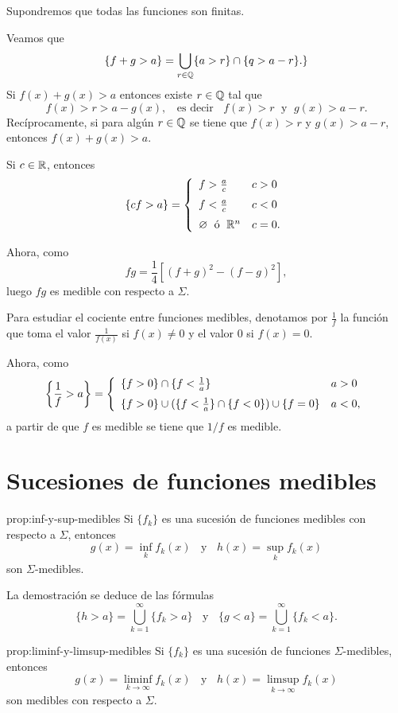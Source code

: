 \begin{demo}
Supondremos que todas las funciones son finitas.

Veamos que 
\[
\{
f+g>a\}=\bigcup\limits_{r \in \mathbb{Q}} \{ a>r\} \cap \{q>a-r\}.
\}
\]
Si $f(x)+g(x)>a$ entonces existe $r \in \mathbb{Q}$ tal que 
\[
f(x)>r>a-g(x),\;\;\mbox{ es decir }\;\; 
f(x)>r\;\mbox{ y }\; g(x)>a-r.
\]
Rec\'iprocamente, si para alg\'un $r\in \mathbb{Q}$ se tiene que $f(x)>r$ y $g(x)>a-r$, entonces $f(x)+g(x)>a$.

Si $c\in \mathbb{R}$, entonces
\[
\{cf>a\}=
\left\{
\begin{array}{ll}
f>\frac{a}{c}&c>0
\medskip
\\
f<\frac{a}{c}&c<0
\medskip
\\
\emptyset\;\mbox{ \'o }\;\rr^n &c=0.
\end{array}
\right.
\]

Ahora, como 
\[
fg=\frac{1}{4}\left[(f+g)^2-(f-g)^2\right],
\]
luego $fg$ es medible con respecto a $\Sigma$. 

Para estudiar el cociente entre funciones medibles, denotamos por $\frac{1}{f}$
la funci\'on que toma el valor $\frac{1}{f(x)}$ si $f(x)\neq 0$ y el valor $0$ si $f(x)=0$.

Ahora, como 
\[
\left\{\frac{1}{f}>a\right\}
=
\left \{
\begin{array}{ll}
 \{f>0\} \cap \{f<\frac{1}{a}\}    &  a>0 
 \medskip
 \\
 \{ f>0\} \cup  (\{f<\frac{1}{a}\} \cap \{f<0\}) \cup \{f=0\}
     & a<0, 
\end{array}
\right.
\]
a partir de que $f$ es medible se tiene que  $1/f$ es medible. 
\end{demo}

\section{Sucesiones de funciones medibles}

\begin{proposicion}{prop:inf-y-sup-medibles}
Si $\{f_k\}$ es una sucesi\'on de funciones medibles con respecto a $\Sigma$, 
entonces
\[
g(x)=\inf\limits_{k} f_k(x) \;\;\mbox{ y }\;\; h(x)=\sup\limits_{k} f_k(x) 
\]
son $\Sigma$-medibles. 
\end{proposicion}


La demostraci\'on se deduce de las f\'ormulas
\[
\{h>a \}=\bigcup_{k=1}^{\infty} \{f_k>a\}
\;\;\mbox{ y }\;\;
\{g<a \}=\bigcup_{k=1}^{\infty} \{f_k<a\}.
\]

\begin{proposicion}{prop:liminf-y-limsup-medibles}
Si $\{f_k\}$ es una sucesi\'on de funciones $\Sigma$-medibles, entonces
\[
g(x)=\liminf\limits_{k \to \infty} f_k(x)
\;\;\mbox{ y }
\;\;
h(x)=\limsup\limits_{k \to \infty} f_k(x)
\]
son   medibles con respecto a $\Sigma$.
\end{proposicion}


